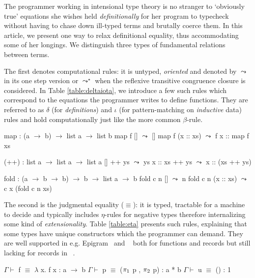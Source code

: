 \documentclass[preprint]{sigplanconf}
\begin{document}
The programmer working in intensional type theory is no stranger to
`obviously true' equations she wishes held \emph{definitionally} for
her program to typecheck without having to chase down ill-typed
terms and brutally coerce them. In this article, we present one way
to relax definitional equality, thus accommodating some of her
longings. We distinguish three types of fundamental relations between terms.

The first denotes computational rules: it is untyped, \emph{oriented} and
denoted by $\leadsto$ in its one step version or $\leadsto^\star$ when the
reflexive transitive congruence closure is considered. In Table
\ref{table:deltaiota}, we introduce a few such rules which correspond to the
equations the programmer writes to define functions. They are referred to as
$\delta$ (for \emph{definitions}) and $\iota$ (for pattern-matching on
\emph{inductive} data) rules and hold computationally just like the more common
$\beta$-rule.

\begin{table}[h]
\begin{Code}
map : (a $\rightarrow$ b) $\rightarrow$ list a $\rightarrow$ list b
map f []        $\leadsto$ []
map f (x :: xs) $\leadsto$ f x :: map f xs

(++) : list a $\rightarrow$ list a $\rightarrow$ list a
[]      ++ ys $\leadsto$ ys
x :: xs ++ ys $\leadsto$ x :: (xs ++ ys)

fold : (a $\rightarrow$ b $\rightarrow$ b) $\rightarrow$ b $\rightarrow$ list a $\rightarrow$ b
fold c n []        $\leadsto$ n
fold c n (x :: xs) $\leadsto$ c x (fold c n xs)
\end{Code}
\caption{\label{table:deltaiota}$\delta\iota$-rules - computational}
\end{table}

The second is the judgmental equality ($\equiv$): it is typed, tractable
for a machine to decide and typically includes $\eta$-rules for negative types
therefore internalizing some kind of \emph{extensionality}.
Table \ref{table:eta} presents such rules, explaining that some types have
unique constructors which the programmer can demand. They are well supported
in e.g. Epigram~\cite{DBLP:conf/sfp/ChapmanAM05} and \agda~\cite{agda} both
for functions and records but still lacking for records in \coq~\cite{coq}.

\begin{table}[h]
\begin{Code}
$\Gamma \vdash$ f $\equiv$ $\lambda$ x. f x      : a $\to$ b
$\Gamma \vdash$ p $\equiv$ ($\operatorname{\pi_1}$ p , $\operatorname{\pi_2}$ p) : a * b
$\Gamma \vdash$ u $\equiv$ ()            : 1
\end{Code}
\caption{\label{table:eta}$\eta$-rules - canonicity}
\end{table}
\end{document}
